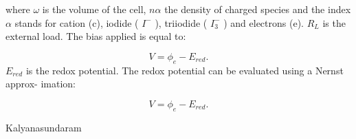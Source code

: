 \documentclass[letterpaper,10pt,english]{sphinxmanual}
\begin{document}
where $\omega$ is the volume of the cell, $n\alpha$ the density of charged species and the index $\alpha$
stands for cation (c), iodide ( $I^{-}$ ), triiodide ( $I^{-}_3$ ) and electrons (e). $R_L$ is the external
load. The bias applied is equal to:

\begin{equation}\label{pot1}
V = \phi_{e} - E_{red}.
\end{equation}
$E_{red}$ is the redox potential. The redox potential can be evaluated using a Nernst approx-
imation:

\begin{equation}\label{pot1}
V = \phi_{e} - E_{red}.
\end{equation}\label{Bibliography:bibliography}
\begin{thebibliography}{Kalyanasundaram}
\end{thebibliography}



\renewcommand{\indexname}{Index}
\printindex
\end{document}
